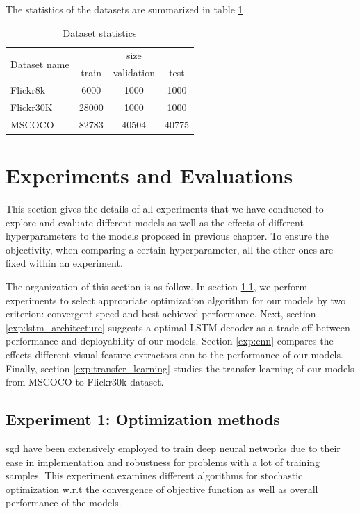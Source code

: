 The statistics of the datasets are summarized in table \ref{tab:dataset-statistics}
\begin{table}
	\centering
	\label{tab:dataset-statistics}
	\begin{tabular}{lccc}
		\toprule
		\multirow{2}{*}{Dataset name} & \multicolumn{3}{c}{size} \\ \cline{2-4}
		& train & validation & test \\ \midrule
		Flickr8k & 6000 & 1000 & 1000 \\
		Flickr30K & 28000 & 1000 & 1000 \\
		MSCOCO & 82783 & 40504 & 40775 \\
		\bottomrule
	\end{tabular}
	\caption{Dataset statistics}
\end{table}


\section{Experiments and Evaluations}
\label{sec:chap4_experiment}

This section gives the details of all experiments that we have conducted to explore and evaluate different models as well as the effects of different hyperparameters to the models proposed in previous chapter. To ensure the objectivity, when comparing a certain hyperparameter, all the other ones are fixed within an experiment. 

The organization of this section is as follow. In section \ref{exp:optim}, we perform experiments to select appropriate optimization algorithm for our models by two criterion: convergent speed and best achieved performance. Next, section \ref{exp:lstm_architecture} suggests a optimal LSTM decoder as a trade-off between performance and deployability of our models. Section \ref{exp:cnn} compares the effects different visual feature extractors \gls{cnn} to the performance of our models. Finally, section \ref{exp:transfer_learning} studies the transfer learning of our models from MSCOCO to Flickr30k dataset.

\subsection{Experiment 1: Optimization methods}
\label{exp:optim}

\gls{sgd} have been extensively employed to train deep neural networks due to their ease in implementation and robustness for problems with a lot of training samples. This experiment examines different algorithms for stochastic optimization w.r.t the convergence of objective function as well as overall performance of the models.

